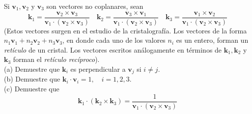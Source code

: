 \item Si $\mathbf{v}_1, \mathbf{v}_2$ y $\mathbf{v}_3$ son vectores no coplanares, sean
    \[
    \mathbf{k}_1 = \frac{\mathbf{v}_2 \times \mathbf{v}_3}{\mathbf{v}_1 \cdot (\mathbf{v}_2 \times \mathbf{v}_3)} \quad \mathbf{k}_2 = \frac{\mathbf{v}_3 \times \mathbf{v}_1}{\mathbf{v}_1 \cdot (\mathbf{v}_2 \times \mathbf{v}_3)} \quad \mathbf{k}_3 = \frac{\mathbf{v}_1 \times \mathbf{v}_2}{\mathbf{v}_1 \cdot (\mathbf{v}_2 \times \mathbf{v}_3)}
    \]
    (Estos vectores surgen en el estudio de la cristalografía. Los vectores de la forma $n_1\mathbf{v}_1 + n_2\mathbf{v}_2 + n_3\mathbf{v}_3$, en donde cada uno de los valores $n_i$ es un entero, forman un \textit{retículo} de un cristal. Los vectores escritos análogamente en términos de $\mathbf{k}_1, \mathbf{k}_2$ y $\mathbf{k}_3$ forman el \textit{retículo recíproco}). \\
    (a) Demuestre que $\mathbf{k}_i$ es perpendicular a $\mathbf{v}_j$ si $i \neq j$. \\
    (b) Demuestre que $\mathbf{k}_i \cdot \mathbf{v}_i = 1, \quad i = 1, 2, 3$. \\
    (c) Demuestre que
    \[
    \mathbf{k}_1 \cdot (\mathbf{k}_2 \times \mathbf{k}_3) = \frac{1}{\mathbf{v}_1 \cdot (\mathbf{v}_2 \times \mathbf{v}_3)}
    \]
